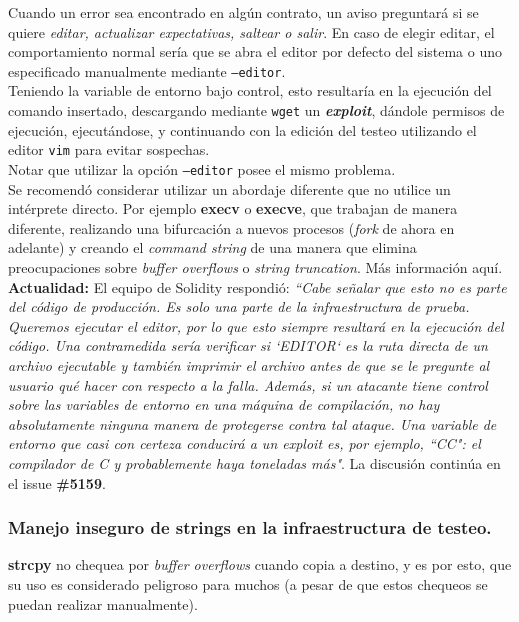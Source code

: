 Cuando un error sea encontrado en algún contrato, un aviso preguntará si se quiere \textit{editar, actualizar expectativas, saltear o salir}. En caso de elegir editar, el comportamiento normal sería que se abra el editor por defecto del sistema o uno especificado manualmente mediante \texttt{--editor}.\\

Teniendo la variable de entorno bajo control, esto resultaría en la ejecución del comando insertado, descargando mediante \texttt{wget} un \textit{\textbf{exploit}}, dándole permisos de ejecución, ejecutándose, y continuando con la edición del testeo utilizando el editor \texttt{vim} para evitar sospechas.\\

Notar que utilizar la opción \texttt{--editor} posee el mismo problema.\\

Se recomendó considerar utilizar un abordaje diferente que no utilice un intérprete directo. Por ejemplo \textbf{execv} o \textbf{execve}, que trabajan de manera diferente, realizando una bifurcación a nuevos procesos (\textit{fork} de ahora en adelante) y creando el \textit{command string} de una manera que elimina preocupaciones sobre \textit{buffer overflows} o \textit{string truncation}. Más información aquí\cite{CMUSystem}.\\

\textbf{Actualidad:} El equipo de Solidity respondió: \textit{“Cabe señalar que esto no es parte del código de producción. Es solo una parte de la infraestructura de prueba. Queremos ejecutar el editor, por lo que esto siempre resultará en la ejecución del código. Una contramedida sería verificar si `EDITOR` es la ruta directa de un archivo ejecutable y también imprimir el archivo antes de que se le pregunte al usuario qué hacer con respecto a la falla. Además, si un atacante tiene control sobre las variables de entorno en una máquina de compilación, no hay absolutamente ninguna manera de protegerse contra tal ataque. Una variable de entorno que casi con certeza conducirá a un exploit es, por ejemplo, ``CC": el compilador de C y probablemente haya toneladas más"}. La discusión continúa en el issue \textbf{\#5159}\cite{GHI5159}.\\

\subsubsection{Manejo inseguro de strings en la infraestructura de testeo.}
\textbf{strcpy} no chequea por \textit{buffer overflows} cuando copia a destino, y es por esto, que su uso es considerado peligroso para muchos\cite{MSSDLBanned} (a pesar de que estos chequeos se puedan realizar manualmente).

